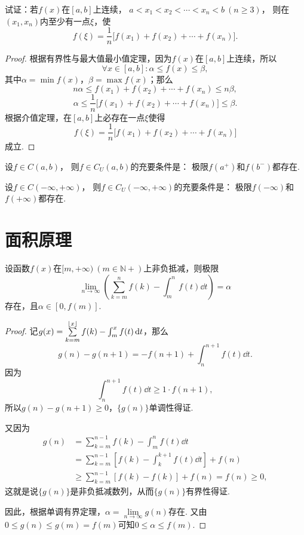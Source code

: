 \begin{example}
试证：若\(f(x)\)在\([a,b]\)上连续，%
\(a < x_1 < x_2 < \dotsb < x_n < b \ (n \geqslant 3)\)，%
则在\((x_1,x_n)\)内至少有一点\(\xi\)，使\[
f(\xi) = \frac{1}{n} \bigl[
	f(x_1) + f(x_2) + \dotsb + f(x_n)
\bigr].
\]
\begin{proof}
根据有界性与最大值最小值定理，因为\(f(x)\)在\([a,b]\)上连续，所以\[
\forall x \in [a,b] :
	\alpha \leqslant f(x) \leqslant \beta,
\]其中\(\alpha = \min f(x)\)，\(\beta = \max f(x)\)；那么\[
n \alpha \leqslant f(x_1) + f(x_2) + \dotsb + f(x_n) \leqslant n \beta,
\]\[
\alpha \leqslant \frac{1}{n} \bigl[f(x_1) + f(x_2) + \dotsb + f(x_n)\bigr] \leqslant \beta.
\]根据介值定理，在\([a,b]\)上必存在一点\(\xi\)使得\[
f(\xi) = \frac{1}{n} \bigl[ f(x_1) + f(x_2) + \dotsb + f(x_n) \bigr]
\]成立.
\end{proof}
\end{example}

\begin{theorem}\label{theorem:极限.闭区间上连续函数的性质.开区间上的连续函数一致连续的充要条件1}
设\(f \in C(a,b)\)，%
则\(f \in C_U(a,b)\)的充要条件是：
极限\(f(a^+)\)和\(f(b^-)\)都存在.
\end{theorem}

\begin{theorem}\label{theorem:极限.闭区间上连续函数的性质.开区间上的连续函数一致连续的充要条件2}
设\(f \in C(-\infty,+\infty)\)，%
则\(f \in C_U(-\infty,+\infty)\)的充要条件是：
极限\(f(-\infty)\)和\(f(+\infty)\)都存在.
\end{theorem}

\section{面积原理}
\begin{theorem}[面积原理]
\def\l{\lim\limits_{n\to\infty}}%
设函数\(f(x)\)在\([m,+\infty)\ (m\in\mathbb{N}+)\)上非负抵减，则极限\[
\l \left(
\sum\limits_{k=m}^n f(k)
- \int_m^n f(t) \dd{t}
\right) = \alpha
\]存在，且\(\alpha\in[0,f(m)]\).
\begin{proof}
记\(g(x)
= \sum\limits_{k=m}^{\lfloor x\rfloor} f(k)
- \int_m^x f(t) \dd{t}\)，那么\[
g(n) - g(n+1)
= -f(n+1)
+ \int_n^{n+1} f(t) \dd{t}.
\]因为\[
\int_n^{n+1} f(t) \dd{t}
\geqslant
1 \cdot f(n+1),
\]所以\(g(n) - g(n+1) \geqslant 0\)，\(\{g(n)\}\)单调性得证.

又因为\begin{align*}
g(n) &= \sum\limits_{k=m}^{n-1} f(k) - \int_m^n f(t) \dd{t} \\
&= \sum\limits_{k=m}^{n-1} \left[
f(k) - \int_k^{k+1} f(t) \dd{t}
\right] + f(n) \\
&\geqslant \sum\limits_{k=m}^{n-1} [f(k) - f(k)] + f(n)
= f(n) \geqslant 0,
\end{align*}
这就是说\(\{g(n)\}\)是非负抵减数列，从而\(\{g(n)\}\)有界性得证.

因此，根据单调有界定理，\(\alpha = \l g(n)\)存在.
又由\(0 \leqslant g(n) \leqslant g(m) = f(m)\)可知\(0 \leqslant \alpha \leqslant f(m)\).
\end{proof}
\end{theorem}

